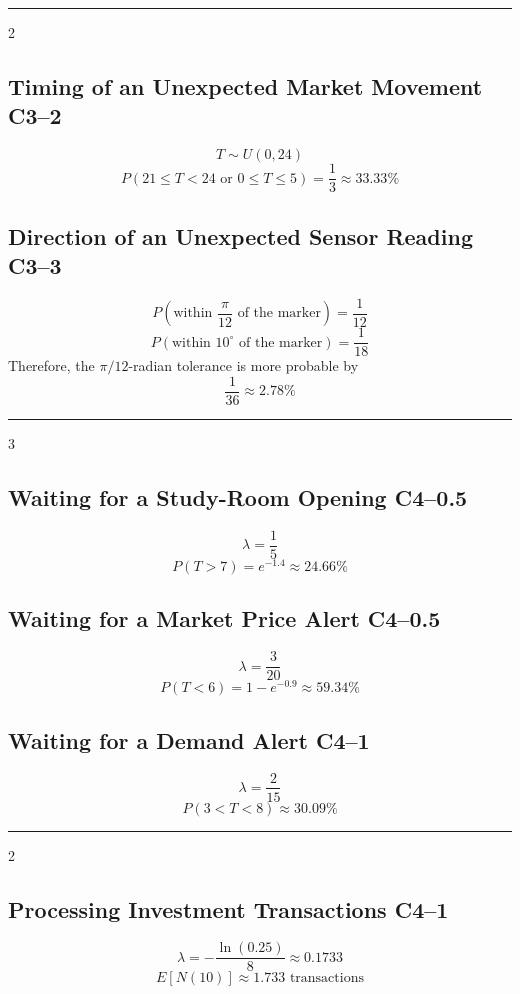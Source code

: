 {		\noindent\rule{\textwidth}{0.5pt}

		\begin{multicols}{2}
			\subsection{Timing of an Unexpected Market Movement \hfill C3--2}
			\[
			T\sim U(0,24)
			\]\[
			\boxed{P(21\le T<24\text{ or }0\le T\le5)
			=\frac13\approx33.33\%}
			\]

			\subsection{Direction of an Unexpected Sensor Reading \hfill C3--3}
			\[
			P\left(\text{within }\frac{\pi}{12}\text{ of the marker}\right)=\frac1{12}
			\]\[
			P\left(\text{within }10^\circ\text{ of the marker}\right)=\frac1{18}
			\]
			Therefore, the \(\pi/12\)-radian tolerance is more probable by
			\[
			\boxed{\frac1{36}\approx2.78\%}
			\]
		\end{multicols}

		\noindent\rule{\textwidth}{0.5pt}

		\begin{multicols}{3}
			\subsection{Waiting for a Study-Room Opening \hfill C4--0.5}
			\[
			\lambda=\frac15
			\]\[
			\boxed{P(T>7)=e^{-1.4}\approx24.66\%}
			\]

			\subsection{Waiting for a Market Price Alert \hfill C4--0.5}
			\[
			\lambda=\frac3{20}
			\]\[
			\boxed{P(T<6)=1-e^{-0.9}\approx59.34\%}
			\]

			\subsection{Waiting for a Demand Alert \hfill C4--1}
			\[
			\lambda=\frac2{15}
			\]\[
			\boxed{P(3<T<8)\approx30.09\%}
			\]
		\end{multicols}

		\noindent\rule{\textwidth}{0.5pt}

		\begin{multicols}{2}
			\subsection{Processing Investment Transactions \hfill C4--1}
			\[
			\lambda=-\frac{\ln(0.25)}8\approx0.1733
			\]\[
			\boxed{E[N(10)]\approx1.733\text{ transactions}}
			\]


\end{multicols}}
